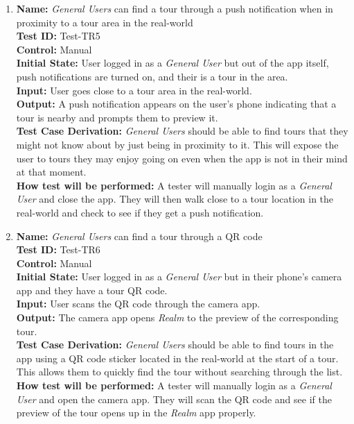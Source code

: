 \documentclass[12pt, titlepage]{article}
\begin{document}
\begin{enumerate}
    \item
    \textbf{Name:} \textit{General Users} can find a tour through a push notification when in proximity to a tour area in the real-world \label{itm:Test-TR5} \\
    \textbf{Test ID:} Test-TR5 \\
    \textbf{Control:} Manual \\
    \textbf{Initial State:} User logged in as a \textit{General User} but out of the app itself, push notifications are turned on, and their is a tour in the area. \\
    \textbf{Input:} User goes close to a tour area in the real-world. \\
    \textbf{Output:} A push notification appears on the user's phone indicating that a tour is nearby and prompts them to preview it. \\
    \textbf{Test Case Derivation:} \textit{General Users} should be able to find tours that they might not know about by just being in proximity to it. This will expose the user to tours they may enjoy going on even when the app is not in their mind at that moment. \\
    \textbf{How test will be performed:} A tester will manually login as a \textit{General User} and close the app. They will then walk close to a tour location in the real-world and check to see if they get a push notification.

    \item
    \textbf{Name:} \textit{General Users} can find a tour through a QR code \label{itm:Test-TR6} \\
    \textbf{Test ID:} Test-TR6 \\
    \textbf{Control:} Manual \\
    \textbf{Initial State:} User logged in as a \textit{General User} but in their phone's camera app and they have a tour QR code. \\
    \textbf{Input:} User scans the QR code through the camera app. \\
    \textbf{Output:} The camera app opens \textit{Realm} to the preview of the corresponding tour. \\
    \textbf{Test Case Derivation:} \textit{General Users} should be able to find tours in the app using a QR code sticker located in the real-world at the start of a tour. This allows them to quickly find the tour without searching through the list. \\
    \textbf{How test will be performed:} A tester will manually login as a \textit{General User} and open the camera app. They will scan the QR code and see if the preview of the tour opens up in the \textit{Realm} app properly.


\end{enumerate}
\end{document}
